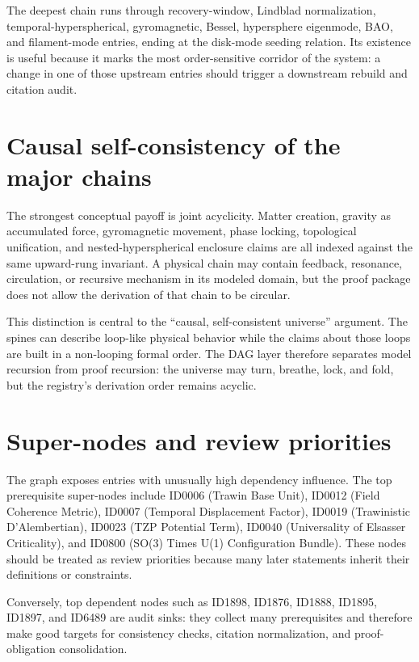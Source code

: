\documentclass[11pt]{article}
\theoremstyle{remark}
\begin{document}
The deepest chain runs through recovery-window, Lindblad normalization, temporal-hyperspherical, gyromagnetic, Bessel, hypersphere eigenmode, BAO, and filament-mode entries, ending at the disk-mode seeding relation. Its existence is useful because it marks the most order-sensitive corridor of the system: a change in one of those upstream entries should trigger a downstream rebuild and citation audit.

\section{Causal self-consistency of the major chains}
\label{sec:causal}

The strongest conceptual payoff is joint acyclicity. Matter creation, gravity as accumulated force, gyromagnetic movement, phase locking, topological unification, and nested-hyperspherical enclosure claims are all indexed against the same upward-rung invariant. A physical chain may contain feedback, resonance, circulation, or recursive mechanism in its modeled domain, but the proof package does not allow the derivation of that chain to be circular.

This distinction is central to the ``causal, self-consistent universe'' argument. The spines can describe loop-like physical behavior while the claims about those loops are built in a non-looping formal order. The DAG layer therefore separates model recursion from proof recursion: the universe may turn, breathe, lock, and fold, but the registry's derivation order remains acyclic.

\section{Super-nodes and review priorities}
\label{sec:supernodes}

The graph exposes entries with unusually high dependency influence. The top prerequisite super-nodes include ID0006 (Trawin Base Unit), ID0012 (Field Coherence Metric), ID0007 (Temporal Displacement Factor), ID0019 (Trawinistic D'Alembertian), ID0023 (TZP Potential Term), ID0040 (Universality of Elsasser Criticality), and ID0800 (SO(3) Times U(1) Configuration Bundle). These nodes should be treated as review priorities because many later statements inherit their definitions or constraints.

Conversely, top dependent nodes such as ID1898, ID1876, ID1888, ID1895, ID1897, and ID6489 are audit sinks: they collect many prerequisites and therefore make good targets for consistency checks, citation normalization, and proof-obligation consolidation.
\end{document}
